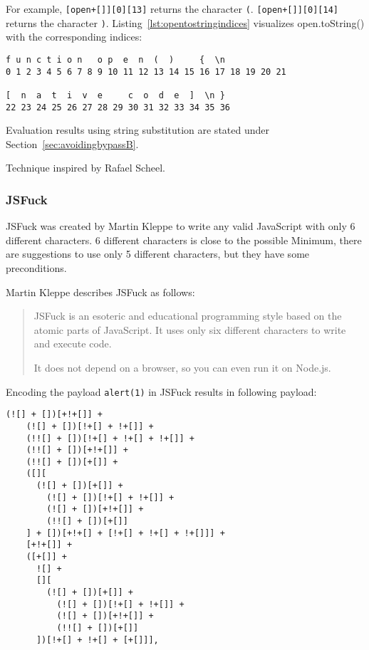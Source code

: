 For example, \verb|[open+[]][0][13]| returns the character \verb|(|. \verb|[open+[]][0][14]| returns the character \verb|)|. Listing~\ref{lst:opentostringindices} visualizes open.toString() with the corresponding indices:

\begin{lstlisting}[style=basicStyle, caption=open.toString() with indices in JavaScript, label={lst:opentostringindices}]
f u n c t i o n   o p  e  n  (  )     {  \n
0 1 2 3 4 5 6 7 8 9 10 11 12 13 14 15 16 17 18 19 20 21

[  n  a  t  i  v  e     c  o  d  e  ]  \n }
22 23 24 25 26 27 28 29 30 31 32 33 34 35 36
\end{lstlisting}

Evaluation results using string substitution are stated under Section~\ref{sec:avoidingbypassB}.

Technique inspired by Rafael Scheel. \cite{onecons/wafbypass}


\subsubsection{JSFuck}
\label{sec:jsfuck}
JSFuck was created by Martin Kleppe to write any valid JavaScript with only 6 different characters. 6 different characters is close to the possible Minimum, there are suggestions to use only 5 different characters, but they have some preconditions. \cite{mk/five, tc39/pipeline}

Martin Kleppe describes JSFuck as follows:
\begin{quote}
	JSFuck is an esoteric and educational programming style based on the atomic parts of JavaScript. It uses only six different characters to write and execute code.

	It does not depend on a browser, so you can even run it on Node.js. \cite{mk/jsfuck}
\end{quote}
Encoding the payload \verb|alert(1)| in JSFuck results in following payload:
\begin{lstlisting}[style=basicStyle, caption=alert(1) in JSFuck, label={lst:alert1jsfuck}]
  (![] + [])[+!+[]] +
    (![] + [])[!+[] + !+[]] +
    (!![] + [])[!+[] + !+[] + !+[]] +
    (!![] + [])[+!+[]] +
    (!![] + [])[+[]] +
    ([][
      (![] + [])[+[]] +
        (![] + [])[!+[] + !+[]] +
        (![] + [])[+!+[]] +
        (!![] + [])[+[]]
    ] + [])[+!+[] + [!+[] + !+[] + !+[]]] +
    [+!+[]] +
    ([+[]] +
      ![] +
      [][
        (![] + [])[+[]] +
          (![] + [])[!+[] + !+[]] +
          (![] + [])[+!+[]] +
          (!![] + [])[+[]]
      ])[!+[] + !+[] + [+[]]],
\end{lstlisting}

